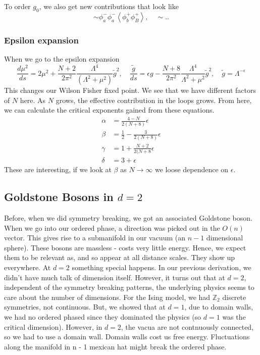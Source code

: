 To order $ g _ 0 $, we also get new contributions that look like 
\[
 \sim \phi _ a ^ - \phi _ a ^ - \left< \phi_ b ^ + \phi _ B ^ +   \right>, \quad 
 \sim ..
\] 
\subsubsection{Epsilon expansion} 

When we go to the epsilon expansion 
\[
	\frac{ d \mu ^ 2 }{ ds } = 2 \mu ^ 2 + \frac{N + 2 }{ 2 \pi ^ 2 } \frac{ \Lambda ^ 4 }{ 
	( \Lambda ^ 2 + \mu ^ 2 ) } \tilde{ g } ^ 2, \quad 
	\frac{ \tilde{ g }  }{ ds }  = \epsilon g  - \frac{ N +  8 }{  2 \pi ^ 2 }  \frac{ \Lambda ^ 4 }{ 
	\Lambda ^ 2+ \mu ^ 2 } \tilde{ g } ^ 2, \quad \tilde{ g }  = \Lambda ^{ - \epsilon }  
\] This changes our Wilson Fisher fixed point. We see that 
we have different factors of $ N $ here. 
As $ N  $ grows, the effective contribution in the loops grows. 
From here, we can calculate the critical exponents gained from 
these equations. 
\begin{align*}
	\alpha &=  \frac{4 - N }{ 2 ( N + 8 ) } \epsilon  \\
	\beta &=  \frac{1}{2 } - \frac{ 3 }{ 2 ( N + 8 ) } \epsilon  \\
	\gamma &=  1 + \frac{ N + 2 }{ 2 ( N + 8  } \epsilon \\
	\delta &=  3  + \epsilon  
\end{align*}
These are interesting, if we look at $ \beta $ as 
$ N \to \infty $ we loose dependence on $\epsilon$. 

\subsection{Goldstone Bosons in $ d = 2 $} 
Before, when we did symmetry breaking, we got an associated Goldstone boson. 
When we go into our ordered phase, a direction was picked out in the $ O ( n )  $ vector. 
This gives rise to a submanifold in our vacuum (an $ n -1 $ dimensional sphere). 
These bosons are massless - costs very little energy. 
Hence, we expect them to be relevant as, and so appear at all distance scales. 
They show up everywhere. 
At $ d =2 $ something special happens. 
In our previous derivation, we didn't have much talk of dimension itself. 
However, it turns out that at $ d = 2$, independent of the symmetry breaking patterns, 
the underlying physics seems to care about the number of dimensions. 
For the Ising model, we had $ \mathbb{ Z} _ 2 $ discrete symmetries, not continuous. 
But, we showed that at $ d = 1 $, due to domain walls, we had no ordered phased 
since they dominated the physics (so $ d = 1 $ was the critical dimension). 
However, in $ d = 2 $, the vacua are not contnuously connected, so 
we had to use a domain wall. Domain walls cost us free energy. Fluctuations 
along the manifold in n - 1 mexican hat might break the ordered phase. 

